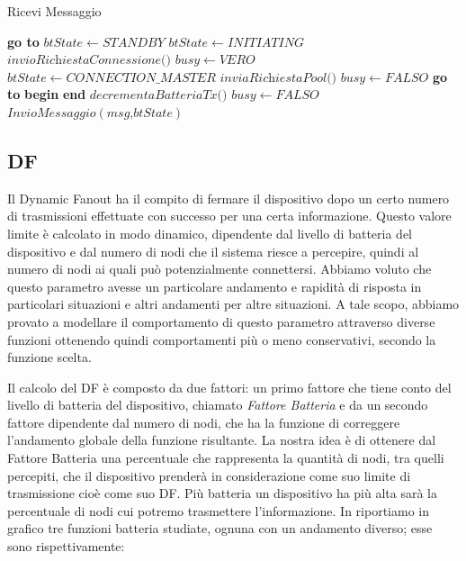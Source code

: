 \bigskip
\begin{algorithm}[th]
	\caption{Ricevi Messaggio}\label{alg:ricevi_msg}
	\begin{algorithmic}[1]
			\State \textbf{go to} 
		\EndIf
		\Label {}
		\State $\textit{btState} \gets STANDBY$
		\State $\textit{btState} \gets INITIATING$
		\Label {}
		\State $ \textit{invioRichiestaConnessione()}$
		\State $ \textit{busy} \gets VERO$
		\State $ \textit{btState} \gets CONNECTION\_MASTER $
		\State $ \textit{inviaRichiestaPool()}$
			\State $ \textit{busy} \gets FALSO$ 
			\State \textbf{go to} 
		\EndIf
		\State \textbf{begin}
			\State{}
		\State \textbf{end}
		\State $ \textit{decrementaBatteriaTx()} $
		\State $ \textit{busy} \gets FALSO$
		\State $ \textit{InvioMessaggio}\left(\textit{msg,btState}\right)  $
		\EndFunction
	\end{algorithmic}
\end{algorithm}
\bigskip

\subsection{\acf{DF}}
Il Dynamic Fanout ha il compito di fermare il dispositivo dopo un certo numero di trasmissioni effettuate con successo per una certa informazione. Questo valore limite è calcolato in modo dinamico, dipendente dal livello di batteria del dispositivo e dal numero di nodi che il sistema riesce a percepire, quindi al numero di nodi ai quali può potenzialmente connettersi. Abbiamo voluto che questo parametro avesse un particolare andamento e rapidità di risposta in particolari situazioni e altri andamenti per altre situazioni. A tale scopo, abbiamo provato a modellare il comportamento di questo parametro attraverso diverse funzioni ottenendo quindi comportamenti più o meno conservativi, secondo la funzione scelta.

Il calcolo del DF è composto da due fattori: un primo fattore che tiene conto del livello di batteria del dispositivo, chiamato \textit{Fattore Batteria} e da un secondo fattore dipendente dal numero di nodi, che ha la funzione di correggere l'andamento globale della funzione risultante. La nostra idea è di ottenere dal Fattore Batteria una percentuale che rappresenta la quantità di nodi, tra quelli percepiti, che il dispositivo prenderà in considerazione come suo limite di trasmissione cioè come suo DF. Più batteria un dispositivo ha più alta sarà la percentuale di nodi cui potremo trasmettere l'informazione. In  riportiamo in grafico tre funzioni batteria studiate, ognuna con un andamento diverso; esse sono rispettivamente:

